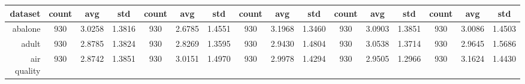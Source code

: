 \begin{table}[htbp]
{\begin{tabular}{rccccccccccccccc}
			\cmidrule{2-16}    \textbf{dataset} & \textbf{count}                      & \textbf{avg}                                                              & \textbf{std}    & \textbf{count}                 & \textbf{avg}                                                                       & \textbf{std}    & \textbf{count}                  & \textbf{avg}                                                              & \textbf{std}    & \textbf{count}                  & \textbf{avg}                                                              & \textbf{std}    & \textbf{count}                  & \textbf{avg}    & \textbf{std}    \\
			\midrule
			abalone                             & 930                                 & 3.0258                                                                    & 1.3816          & 930                            & \cellcolor[rgb]{ .776,  .937,  .808}\textcolor[rgb]{ 0,  .38,  0}{2.6785}          & 1.4551          & 930                             & 3.1968                                                                    & 1.3460          & 930                             & 3.0903                                                                    & 1.3851          & 930                             & 3.0086          & 1.4503          \\
			adult                               & 930                                 & 2.8785                                                                    & 1.3824          & 930                            & \cellcolor[rgb]{ .776,  .937,  .808}\textcolor[rgb]{ 0,  .38,  0}{2.8269}          & 1.3595          & 930                             & 2.9430                                                                    & 1.4804          & 930                             & 3.0538                                                                    & 1.3714          & 930                             & 2.9645          & 1.5686          \\
			air quality                         & 930                                 & \cellcolor[rgb]{ .776,  .937,  .808}\textcolor[rgb]{ 0,  .38,  0}{2.8742} & 1.3851          & 930                            & 3.0151                                                                             & 1.4970          & 930                             & 2.9978                                                                    & 1.4294          & 930                             & 2.9505                                                                    & 1.2966          & 930                             & 3.1624          & 1.4430          \\

\end{tabular}}
\end{table}
